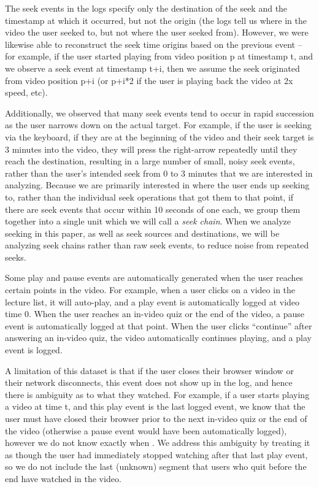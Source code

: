 \documentclass{sigchi}
\begin{document}
The seek events in the logs specify only the destination of the seek and the timestamp at which it occurred, but not the origin (the logs tell us where in the video the user seeked to, but not where the user seeked from). However, we were likewise able to reconstruct the seek time origins based on the previous event -- for example, if the user started playing from video position p at timestamp t, and we observe a seek event at timestamp t+i, then we assume the seek originated from video position p+i (or p+i*2 if the user is playing back the video at 2x speed, etc).

Additionally, we observed that many seek events tend to occur in rapid succession as the user narrows down on the actual target. For example, if the user is seeking via the keyboard, if they are at the beginning of the video and their seek target is 3 minutes into the video, they will press the right-arrow repeatedly until they reach the destination, resulting in a large number of small, noisy seek events, rather than the user's intended seek from 0 to 3 minutes that we are interested in analyzing. Because we are primarily interested in where the user ends up seeking to, rather than the individual seek operations that got them to that point, if there are seek events that occur within 10 seconds of one each, we group them together into a single unit which we will call a \textit{seek chain}. When we analyze seeking in this paper, as well as seek sources and destinations, we will be analyzing seek chains rather than raw seek events, to reduce noise from repeated seeks.

Some play and pause events are automatically generated when the user reaches certain points in the video. For example, when a user clicks on a video in the lecture list, it will auto-play, and a play event is automatically logged at video time 0. When the user reaches an in-video quiz or the end of the video, a pause event is automatically logged at that point. When the user clicks ``continue'' after answering an in-video quiz, the video automatically continues playing, and a play event is logged.

A limitation of this dataset is that if the user closes their browser window or their network disconnects, this event does not show up in the log, and hence there is ambiguity as to what they watched. For example, if a user starts playing a video at time t, and this play event is the last logged event, we know that the user must have closed their browser prior to the next in-video quiz or the end of the video (otherwise a pause event would have been automatically logged), however we do not know exactly when . We address this ambiguity by treating it as though the user had immediately stopped watching after that last play event, so we do not include the last (unknown) segment that users who quit before the end have watched in the video.
\end{document}
